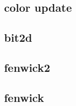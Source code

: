 \subsection{color update}
\raggedbottom
\hrulefill
\subsection{bit2d}
\raggedbottom
\hrulefill
\subsection{fenwick2}
\raggedbottom
\hrulefill
\subsection{fenwick}
\raggedbottom
\hrulefill

